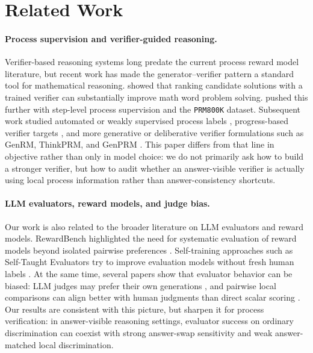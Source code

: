 \section{Related Work}

\paragraph{Process supervision and verifier-guided reasoning.}
Verifier-based reasoning systems long predate the current process reward model
literature, but recent work has made the generator--verifier pattern a standard
tool for mathematical reasoning. \citet{cobbe2021training} showed that ranking
candidate solutions with a trained verifier can substantially improve math word
problem solving. \citet{lightman2023verify} pushed this further with
step-level process supervision and the \texttt{PRM800K} dataset. Subsequent
work studied automated or weakly supervised process labels
\citep{wang2024mips}, progress-based verifier targets \citep{setlur2024pav},
and more generative or deliberative verifier formulations such as GenRM,
ThinkPRM, and GenPRM \citep{zhang2024genrm,khalifa2025thinkprm,zhao2025genprm}.
This paper differs from that line in objective rather than only in model
choice: we do not primarily ask how to build a stronger verifier, but how to
audit whether an answer-visible verifier is actually using local process
information rather than answer-consistency shortcuts.

\paragraph{LLM evaluators, reward models, and judge bias.}
Our work is also related to the broader literature on LLM evaluators and reward
models. RewardBench highlighted the need for systematic evaluation of reward
models beyond isolated pairwise preferences \citep{lambert2024rewardbench}.
Self-training approaches such as Self-Taught Evaluators try to improve
evaluation models without fresh human labels \citep{wang2024selftaught}. At the
same time, several papers show that evaluator behavior can be biased: LLM
judges may prefer their own generations \citep{panickssery2024selfprefer}, and
pairwise local comparisons can align better with human judgments than direct
scalar scoring \citep{liu2024pairwise}. Our results are consistent with this
picture, but sharpen it for process verification: in answer-visible reasoning
settings, evaluator success on ordinary discrimination can coexist with strong
answer-swap sensitivity and weak answer-matched local discrimination.

